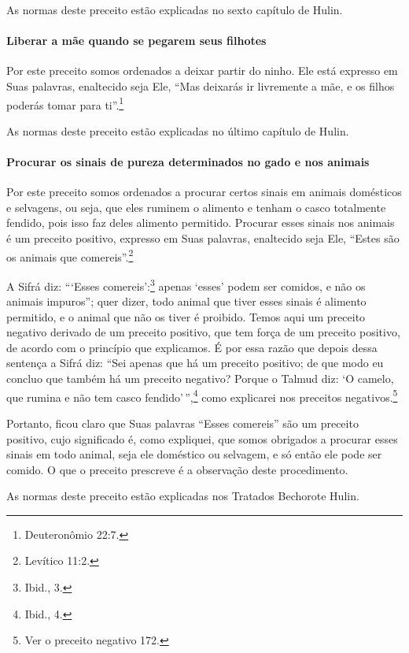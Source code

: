 \begin{multicols}{2}
As normas deste preceito estão explicadas no sexto capítulo de Hulin\starr.

\paragraph{Liberar a mãe quando se pegarem seus filhotes}

Por este preceito somos ordenados a deixar partir do ninho. Ele está
expresso em Suas palavras, enaltecido seja Ele, ``Mas deixarás ir
livremente a mãe, e os filhos poderás tomar para ti''.\footnote{Deuteronômio
22:7.}

As normas deste preceito estão explicadas no último capítulo de Hulin\starr.

\paragraph{Procurar os sinais de pureza determinados no gado e nos animais}

Por este preceito somos ordenados a procurar certos sinais em animais
domésticos e selvagens, ou seja, que eles ruminem o alimento e tenham o
casco totalmente fendido, pois isso faz deles alimento permitido.
Procurar esses sinais nos animais é um preceito positivo, expresso em
Suas palavras, enaltecido seja Ele, ``Estes são os animais que
comereis''.\footnote{Levítico 11:2.}

A Sifrá\starr{} diz: ```Esses comereis':\footnote{Ibid., 3.} apenas `esses' podem ser
comidos, e não os animais impuros''; quer dizer, todo animal que tiver
esses sinais é alimento permitido, e o animal que não os tiver é
proibido. Temos aqui um preceito negativo derivado de um preceito
positivo, que tem força de um preceito positivo, de acordo com o
princípio que explicamos. É por essa razão que depois dessa sentença a
Sifrá\starr{} diz: ``Sei apenas que há um preceito positivo; de que modo eu
concluo que também há um preceito negativo? Porque o Talmud\starr{} diz: `O camelo, que rumina e não tem casco fendido'\,'',\footnote{Ibid., 4.}
como explicarei nos preceitos negativos.\footnote{Ver o preceito negativo 172.}

Portanto, ficou claro que Suas palavras ``Esses comereis'' são um preceito positivo, cujo significado é, como expliquei, que somos obrigados
a procurar esses sinais em todo animal, seja ele doméstico ou selvagem,
e só então ele pode ser comido. O que o preceito prescreve é a
observação deste procedimento.

As normas deste preceito estão explicadas nos Tratados Bechorot\starr e Hulin\starr.


\end{multicols}
